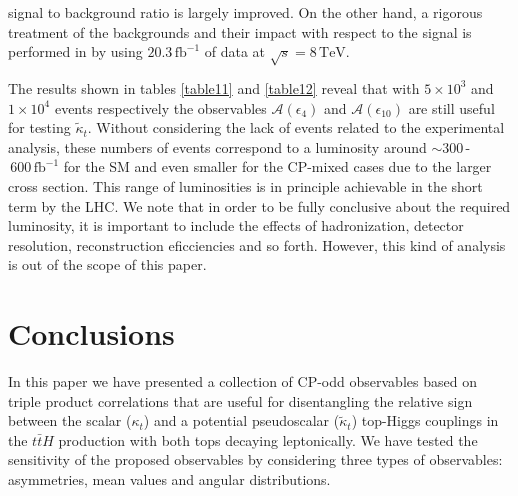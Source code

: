 \documentclass[aps,preprint,tightenlines,floatfix,superscriptaddress,nofootinbib,showpacs]{revtex4-1}
\def\tbar{\bar{t}}
\def\kp{\kappa_t}
\def\kpt{\tilde{\kappa}_t}
\begin{document}
\noindent
%
signal to background ratio is largely improved. On the other hand, a
rigorous treatment of the backgrounds and their impact with respect to
the signal is performed in \cite{atlasger} by using $20.3\,
\mathrm{fb}^{-1}$ of data at $\sqrt{s}=8\,\mathrm{TeV}$.  \par The
results shown in tables \ref{table11} and \ref{table12} reveal that
with $5\times 10^3$ and $1\times 10^4$ events respectively the
observables $\mathcal{A}(\epsilon_4)$ and $\mathcal{A}(\epsilon_{10})$
are still useful for testing $\kpt$. Without considering the lack of
events related to the experimental analysis, these numbers of events
correspond to a luminosity around $\sim
300\,$-$\,600\,\mathrm{fb}^{-1}$ for the SM and even smaller for the
$\mathrm{CP}$-mixed cases due to the larger cross section. This range
of luminosities is in principle achievable in the short term by the
LHC. We note that in order to be fully conclusive about the required
luminosity, it is important to include the effects of hadronization,
detector resolution, reconstruction eficciencies and so
forth. However, this kind of analysis is out of the scope of this
paper.
%
\section{Conclusions}
\label{sec7}
%
In this paper we have presented a collection of $\mathrm{CP}$-odd
observables based on triple product correlations that are useful for
disentangling the relative sign between the scalar ($\kp$) and a
potential pseudoscalar ($\kpt$) top-Higgs couplings in the $t\tbar H$
production with both tops decaying leptonically. We have tested the
sensitivity of the proposed observables by considering three types of
observables: asymmetries, mean values and angular distributions.\par
\end{document}
